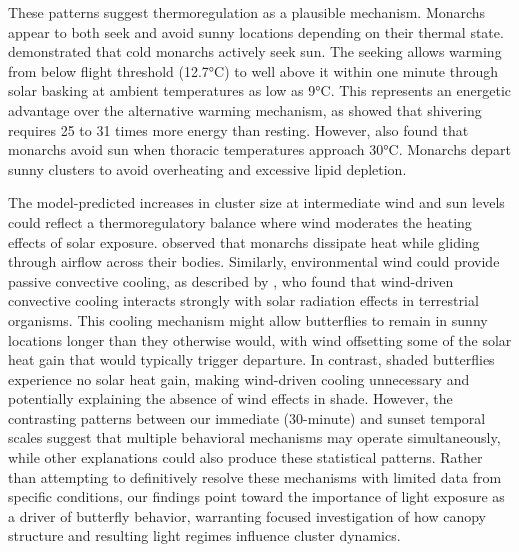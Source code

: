 These patterns suggest thermoregulation as a plausible mechanism. Monarchs appear to both seek and avoid sunny locations depending on their thermal state. \textcite{mastersMonarchButterflyDanaus1988} demonstrated that cold monarchs actively seek sun. The seeking allows warming from below flight threshold (12.7°C) to well above it within one minute through solar basking at ambient temperatures as low as 9°C. This represents an energetic advantage over the alternative warming mechanism, as \textcite{kammerThoracicTemperatureShivering1970} showed that shivering requires 25 to 31 times more energy than resting. However, \textcite{mastersMonarchButterflyDanaus1988} also found that monarchs avoid sun when thoracic temperatures approach 30°C. Monarchs depart sunny clusters to avoid overheating and excessive lipid depletion.

The model-predicted increases in cluster size at intermediate wind and sun levels could reflect a thermoregulatory balance where wind moderates the heating effects of solar exposure. \textcite{mastersMonarchButterflyDanaus1988} observed that monarchs dissipate heat while gliding through airflow across their bodies. Similarly, environmental wind could provide passive convective cooling, as described by \textcite{riddellWindNicheThermal2025}, who found that wind-driven convective cooling interacts strongly with solar radiation effects in terrestrial organisms. This cooling mechanism might allow butterflies to remain in sunny locations longer than they otherwise would, with wind offsetting some of the solar heat gain that would typically trigger departure. In contrast, shaded butterflies experience no solar heat gain, making wind-driven cooling unnecessary and potentially explaining the absence of wind effects in shade. However, the contrasting patterns between our immediate (30-minute) and sunset temporal scales suggest that multiple behavioral mechanisms may operate simultaneously, while other explanations could also produce these statistical patterns. Rather than attempting to definitively resolve these mechanisms with limited data from specific conditions, our findings point toward the importance of light exposure as a driver of butterfly behavior, warranting focused investigation of how canopy structure and resulting light regimes influence cluster dynamics.

